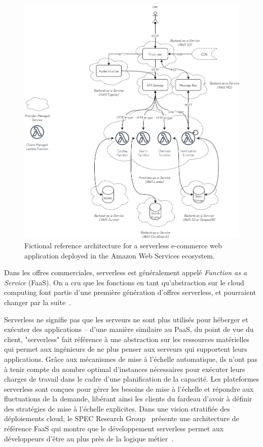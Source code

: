 \begin{figure}[htbp]
    \centering
	\includegraphics[width=\textwidth]{2_Chapitre2/figures/faas-web-app.png}
	\caption{Fictional reference architecture for a serverless e-commerce web application deployed in the Amazon Web Services ecosystem.}
	\label{fig:web-app}
\end{figure}

Dans les offres commerciales, serverless est généralement appelé \textit{Function as a Service} (FaaS). On a cru que les fonctions en tant qu'abstraction sur le cloud computing font partie d'une première génération d'offres serverless, et pourraient changer par la suite~\cite{hellersteinServerlessComputingOne2019}.

Serverless ne signifie pas que les serveurs ne sont plus utilisés pour héberger et exécuter des applications -- d'une manière similaire au PaaS, du point de vue du client, "serverless" fait référence à une abstraction sur les ressources matérielles qui permet aux ingénieurs de ne plus penser aux serveurs qui supportent leurs applications. Grâce aux mécanismes de mise à l'échelle automatique, ils n'ont pas à tenir compte du nombre optimal d'instances nécessaires pour exécuter leurs charges de travail dans le cadre d'une planification de la capacité. Les plateformes serverless sont conçues pour gérer les besoins de mise à l'échelle et répondre aux fluctuations de la demande, libérant ainsi les clients du fardeau d'avoir à définir des stratégies de mise à l'échelle explicites. Dans une vision stratifiée des déploiements cloud, le SPEC Research Group~\cite{spec-rg} présente une architecture de référence FaaS qui montre que le développement serverless permet aux développeurs d'être au plus près de la logique métier~\cite{vaneykSPECRGCloud2018, vaneykSPECRGReferenceArchitecture2019}.

